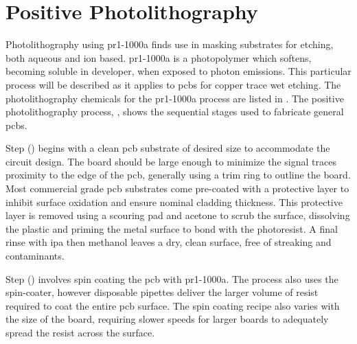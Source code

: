 \documentclass[../../main.tex]{subfiles}
\begin{document}
%
    \section{Positive Photolithography}%
    \label{app:thin-film-processing:positive-photolithography}%
    Photolithography using \gls{pr1-1000a} finds use in masking substrates for etching, both aqueous and ion based.
    \Gls{pr1-1000a} is a photopolymer which softens, becoming soluble in developer, when exposed to photon emissions.
    This particular process will be described as it applies to \glspl{pcb} for copper trace wet etching.
    The photolithography chemicals for the \gls{pr1-1000a} process are listed in .
    The positive photolithography process, , shows the sequential stages used to fabricate general \glspl{pcb}.
    \par%
    Step () begins with a clean \gls{pcb} substrate of desired size to accommodate the circuit design.
    The board should be large enough to minimize the signal traces proximity to the edge of the \gls{pcb}, generally using a trim ring to outline the board.
    Most commercial grade \gls{pcb} substrates come pre-coated with a protective layer to inhibit surface oxidation and ensure nominal cladding thickness.
    This protective layer is removed using a scouring pad and \gls{acetone} to scrub the surface, dissolving the plastic and priming the metal surface to bond with the photoresist.
	A final rinse with \gls{ipa} then \gls{methanol} leaves a dry, clean surface, free of streaking and contaminants.
    \par%
    Step () involves spin coating the \gls{pcb} with \gls{pr1-1000a}.
    The process also uses the \gls{spin-coater}, however disposable pipettes deliver the larger volume of resist required to coat the entire \gls{pcb} surface.
    The spin coating recipe also varies with the size of the board, requiring slower speeds for larger boards to adequately spread the resist across the surface.
\end{document}
